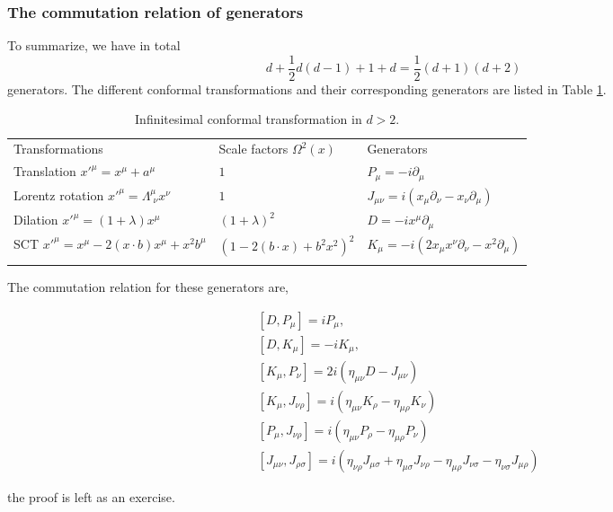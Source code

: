 \documentclass[graybox,envcountchap,sectrefs]{svmono}
\begin{document}
\subsubsection{The commutation relation of generators}
To summarize, we have in total 
\begin{equation}
d+\frac{1}{2}d(d-1)+1+d=\frac{1}{2}(d+1)(d+2)
\end{equation}
generators. The different conformal transformations and their corresponding generators are listed in Table \ref{tab:CFT}.

\begin{table}[hb]
\caption{Infinitesimal conformal transformation in $d>2$.}
\label{tab:CFT}       %
\begin{tabular}{p{4.5cm}p{3cm}p{4.0cm}}
\hline\noalign{\smallskip}
Transformations  & Scale factors $\Omega^2(x)$ & Generators  \\
\noalign{\smallskip}\hline\noalign{\smallskip}
Translation $x'^{\mu}=x^{\mu}+a^{\mu}$  & $1$ & $P_{\mu}=-i\partial_{\mu}$\\
Lorentz rotation $x'^{\mu}=\Lambda^{\mu}_{\,\,\nu}x^{\nu}$  & $1$  & $J_{\mu\nu}=i(x_{\mu}\partial_{\nu}-x_{\nu}\partial_{\mu})$\\
Dilation  $x'^{\mu}=(1+\lambda)x^{\mu}$ & $(1+\lambda)^2$  & $D=-ix^{\mu}\partial_{\mu}$\\
SCT $x'^{\mu}=x^{\mu}-2(x\cdot b)x^{\mu}+x^2b^{\mu}$  & $(1-2 (b\cdot x)+b^2x^2)^2$ &  $K_{\mu}=-i(2x_{\mu}x^{\nu}\partial_{\nu}-x^2 \partial_{\mu})$\\
\noalign{\smallskip}\hline\noalign{\smallskip}
\end{tabular}
\end{table}

The commutation relation for these generators are,
\begin{svgraybox}
\begin{align}
&\left[D, P_{\mu}\right] =i P_{\mu},\\
&\left[D, K_{\mu}\right]=-i K_{\mu},\\
&\left[K_{\mu}, P_{\nu}\right]=2 i\left(\eta_{\mu \nu} D-J_{\mu \nu}\right) \\
&\left[K_{\mu}, J_{\nu \rho}\right] =i\left(\eta_{\mu \nu} K_{\rho}-\eta_{\mu \rho} K_{\nu}\right) \\
&\left[P_{\mu}, J_{\nu \rho}\right] =i\left(\eta_{\mu \nu} P_{\rho}-\eta_{\mu \rho} P_{\nu}\right) \\
&\left[J_{\mu \nu}, J_{\rho \sigma}\right] =i\left(\eta_{\nu \rho} J_{\mu \sigma}+\eta_{\mu \sigma} J_{\nu \rho}-\eta_{\mu \rho} J_{\nu \sigma}-\eta_{\nu \sigma} J_{\mu \rho}\right)
\end{align}
\end{svgraybox}
the proof is left as an exercise.
\end{document}
